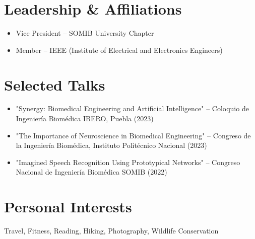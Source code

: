 \section*{Leadership \& Affiliations}
\begin{itemize}
 \item Vice President – SOMIB University Chapter
 \item Member – IEEE (Institute of Electrical and Electronics Engineers)
\end{itemize}

\section*{Selected Talks}
\begin{itemize}
 \item "Synergy: Biomedical Engineering and Artificial Intelligence" – Coloquio de Ingeniería Biomédica IBERO, Puebla (2023)
 \item "The Importance of Neuroscience in Biomedical Engineering" – Congreso de la Ingeniería Biomédica, Instituto Politécnico Nacional (2023)
 \item "Imagined Speech Recognition Using Prototypical Networks" – Congreso Nacional de Ingeniería Biomédica SOMIB (2022)
\end{itemize}

\section*{Personal Interests}
Travel, Fitness, Reading, Hiking, Photography, Wildlife Conservation